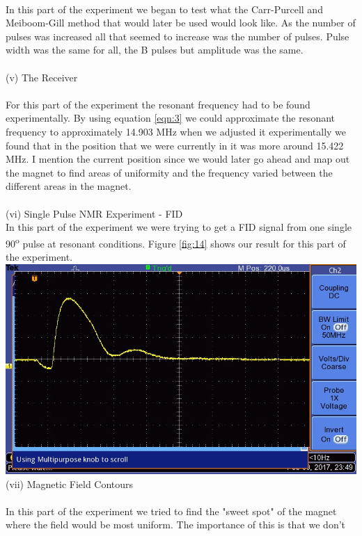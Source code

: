 \documentclass{article}
\begin{document}
{\begin{multicols}{2}
\\
In this part of the experiment we began to test what the Carr-Purcell and 
Meiboom-Gill method that would later be used would look like. As the number of 
pulses was increased all that seemed to increase was the number of pulses. 
Pulse width was the same for all, the B pulses but amplitude was the same. \\
\\
(v) The Receiver \\
\\
For this part of the experiment the resonant frequency had to be found 
experimentally. By using equation \ref{eqn:3} we could approximate the resonant 
frequency to approximately 14.903 MHz when we adjusted it experimentally we 
found that in the position that we were currently in it was more around 
15.422 MHz. I mention the current position since we would later go ahead and 
map out the magnet to find areas of uniformity and the frequency varied between 
the different areas in the magnet. \\
\\
(vi) Single Pulse NMR Experiment - FID \\
In this part of the experiment we were trying to get a FID signal from one 
single 90\textsuperscript{o} pulse at resonant conditions. Figure \ref{fig:14} 
shows our result for this part of the experiment.
\center
\includegraphics[width=\linewidth]{Early-Data/ALL0017/F0017TEK.jpg}
\label{fig:14}
\justify
(vii) Magnetic Field Contours \\
\\
In this part of the experiment we tried to find the "sweet spot" of the magnet 
where the field would be most uniform. The importance of this is that we don't 

\end{multicols}}
\end{document}
